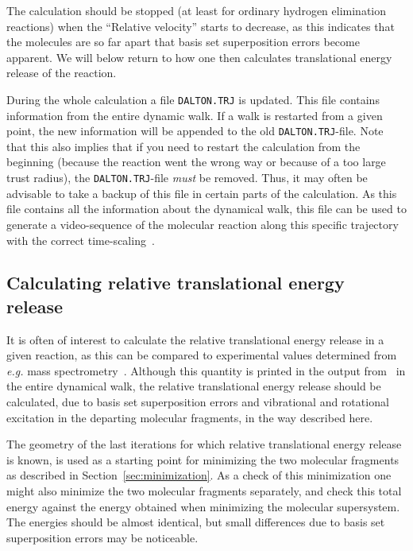 The calculation should be stopped (at least for ordinary hydrogen
elimination reactions) when the ``Relative velocity'' starts to
decrease, as this indicates that the molecules are so far apart that
basis set superposition errors
become apparent. We will below return to how
one then calculates translational energy release of the reaction.

During the whole calculation a file
\texttt{DALTON.TRJ} is updated. This
file contains information from the entire dynamic walk. If a
walk is restarted from a given point, the new information will be
appended to the old \texttt{DALTON.TRJ}-file. Note that this also implies
that if you need to restart the calculation from the beginning
(because the reaction went the wrong way or because of a too large trust
radius), the
\texttt{DALTON.TRJ}-file {\em must} be removed. Thus, it may often be
advisable to take a backup of this file in certain parts of the
calculation. As this file contains all the information about the
dynamical walk, this file can be used to generate a video-sequence of
the molecular reaction along this specific trajectory with the correct
time-scaling~\cite{krtheujms393}.

\subsection{Calculating relative translational energy release}

It is often of interest to calculate the relative translational energy
release in a given reaction, as this can be compared to experimental
values determined from {\it e.g.\/} mass
spectrometry~\cite{theuhjajcpl173}. Although
this quantity
is printed in the output from \dalton\ in the entire dynamical walk, the
relative translational energy release should be calculated, due to
basis set superposition errors
and vibrational and rotational
excitation in the departing molecular
fragments, in the way described here.

The geometry of the last iterations for which relative translational
energy release is known, is used as a starting point for minimizing
the two molecular fragments as described in
Section~\ref{sec:minimization}. As a check of this minimization one
might also minimize the two molecular fragments separately, and check
this total energy against the energy obtained when minimizing the
molecular supersystem. The energies should be almost identical, but
small differences due to basis set superposition errors may be
noticeable.

